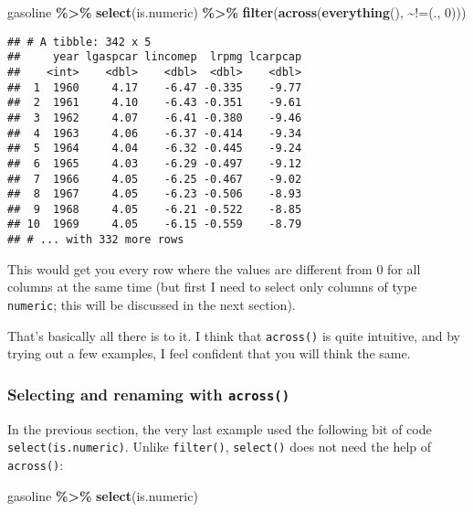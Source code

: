 \documentclass[
]{article}
\newenvironment{Shaded}{\begin{snugshade}}{\end{snugshade}}
\newcommand{\DataTypeTok}[1]{\textcolor[rgb]{0.13,0.29,0.53}{#1}}
\newcommand{\DecValTok}[1]{\textcolor[rgb]{0.00,0.00,0.81}{#1}}
\newcommand{\KeywordTok}[1]{\textcolor[rgb]{0.13,0.29,0.53}{\textbf{#1}}}
\newcommand{\NormalTok}[1]{#1}
\newcommand{\OperatorTok}[1]{\textcolor[rgb]{0.81,0.36,0.00}{\textbf{#1}}}
\newcommand{\StringTok}[1]{\textcolor[rgb]{0.31,0.60,0.02}{#1}}
\begin{document}
\begin{Shaded}
\begin{Highlighting}[]
\NormalTok{gasoline }\OperatorTok{\%\textgreater{}\%}
\StringTok{  }\KeywordTok{select}\NormalTok{(is.numeric) }\OperatorTok{\%\textgreater{}\%}\StringTok{  }
\StringTok{  }\KeywordTok{filter}\NormalTok{(}\KeywordTok{across}\NormalTok{(}\KeywordTok{everything}\NormalTok{(), }\OperatorTok{\textasciitilde{}}\StringTok{\textasciigrave{}}\DataTypeTok{!=}\StringTok{\textasciigrave{}}\NormalTok{(., }\DecValTok{0}\NormalTok{)))}
\end{Highlighting}
\end{Shaded}

\begin{verbatim}
## # A tibble: 342 x 5
##     year lgaspcar lincomep  lrpmg lcarpcap
##    <int>    <dbl>    <dbl>  <dbl>    <dbl>
##  1  1960     4.17    -6.47 -0.335    -9.77
##  2  1961     4.10    -6.43 -0.351    -9.61
##  3  1962     4.07    -6.41 -0.380    -9.46
##  4  1963     4.06    -6.37 -0.414    -9.34
##  5  1964     4.04    -6.32 -0.445    -9.24
##  6  1965     4.03    -6.29 -0.497    -9.12
##  7  1966     4.05    -6.25 -0.467    -9.02
##  8  1967     4.05    -6.23 -0.506    -8.93
##  9  1968     4.05    -6.21 -0.522    -8.85
## 10  1969     4.05    -6.15 -0.559    -8.79
## # ... with 332 more rows
\end{verbatim}

This would get you every row where the values are different from 0 for all columns at the
same time (but first I need to select only columns of type \texttt{numeric}; this will be discussed
in the next section).

That's basically all there is to it. I think that \texttt{across()} is quite intuitive, and by trying out
a few examples, I feel confident that you will think the same.

\hypertarget{selecting-and-renaming-with-across}{%
\subsubsection{\texorpdfstring{Selecting and renaming with \texttt{across()}}{Selecting and renaming with across()}}\label{selecting-and-renaming-with-across}}

In the previous section, the very last example used the following bit of code \texttt{select(is.numeric)}.
Unlike \texttt{filter()}, \texttt{select()} does not need the help of \texttt{across()}:

\begin{Shaded}
\begin{Highlighting}[]
\NormalTok{gasoline }\OperatorTok{\%\textgreater{}\%}
\StringTok{  }\KeywordTok{select}\NormalTok{(is.numeric)}
\end{Highlighting}
\end{Shaded}
\end{document}
